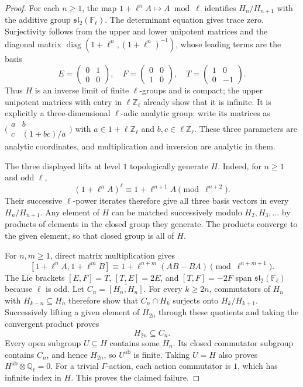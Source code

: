 \begin{proof}
For each $n\ge1$, the map
$1+\ell^n A\mapsto A\bmod\ell$ identifies
$H_n/H_{n+1}$ with the additive group
$\mathfrak{sl}_2(\mathbb F_\ell)$. The determinant equation gives
trace zero. Surjectivity follows from the upper and lower unipotent
matrices and the diagonal matrix
$\operatorname{diag}(1+\ell^n,(1+\ell^n)^{-1})$, whose leading terms
are the basis
\[
 E=\begin{pmatrix}0&1\\0&0\end{pmatrix},\quad
 F=\begin{pmatrix}0&0\\1&0\end{pmatrix},\quad
 T=\begin{pmatrix}1&0\\0&-1\end{pmatrix}.
\]
Thus $H$ is an inverse limit of finite $\ell$-groups and is compact;
the upper unipotent matrices with entry in $\ell\mathbb Z_\ell$
already show that it is infinite.
It is explicitly a three-dimensional $\ell$-adic analytic group:
write its matrices as
$\bigl(\begin{smallmatrix}a&b\\c&(1+bc)/a\end{smallmatrix}\bigr)$
with $a\in1+\ell\mathbb Z_\ell$ and
$b,c\in\ell\mathbb Z_\ell$. These three parameters are analytic
coordinates, and multiplication and inversion are analytic in them.

The three displayed lifts at level $1$ topologically generate $H$.
Indeed, for $n\ge1$ and odd $\ell$,
\[
 (1+\ell^n A)^\ell\equiv1+\ell^{n+1}A
                       \pmod{\ell^{n+2}}.
\]
Their successive $\ell$-power iterates therefore give all three basis
vectors in every $H_n/H_{n+1}$. Any element of $H$ can be matched
successively modulo $H_2,H_3,\ldots$ by products of elements in the
closed group they generate. The products converge to the given element,
so that closed group is all of $H$.

For $n,m\ge1$, direct matrix multiplication gives
\[
 [1+\ell^n A,1+\ell^m B]
       \equiv1+\ell^{n+m}(AB-BA)
                      \pmod{\ell^{n+m+1}}.
\]
The Lie brackets $[E,F]=T$, $[T,E]=2E$, and $[T,F]=-2F$
span $\mathfrak{sl}_2(\mathbb F_\ell)$ because $\ell$ is odd.
Let $C_n=\overline{[H_n,H_n]}$. For every $k\ge2n$, commutators
of $H_n$ with $H_{k-n}\subseteq H_n$ therefore show that
$C_n\cap H_k$ surjects onto $H_k/H_{k+1}$. Successively lifting a
given element of $H_{2n}$ through these quotients and taking the
convergent product proves
\[
 H_{2n}\subseteq C_n.
\]
Every open subgroup $U\subseteq H$ contains some $H_n$. Its closed
commutator subgroup contains $C_n$, and hence $H_{2n}$, so
$U^{\mathrm{ab}}$ is finite. Taking $U=H$ also proves
$H^{\mathrm{ab}}\otimes\mathbb Q_\ell=0$.
For a trivial $\Gamma$-action, each action commutator is $1$,
which has infinite index in $H$. This proves the claimed failure.
\end{proof}

